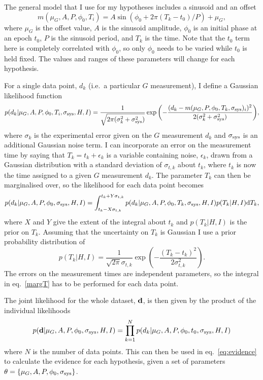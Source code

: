 \documentclass[page-classic]{epl2}
\begin{document}
The general model that I use for my hypotheses includes a sinusoid and an offset
\begin{equation}\label{eq:model}
 m(\mu_G, A, P, \phi_0, T_i) = A\sin{(\phi_0 + 2\pi (T_k-t_0)/P)} + \mu_G,
\end{equation}
where $\mu_G$ is the offset value, $A$ is the sinusoid amplitude, $\phi_0$ is an initial phase at an epoch $t_0$,
$P$ is the sinusoid period, and $T_k$ is the time. Note that the $t_0$ term here is completely correlated
with $\phi_0$, so only $\phi_0$ needs to be varied while $t_0$ is held fixed. The values and ranges of these 
parameters will change for each hypothesis.

For a single data point, $d_k$ (i.e.\ a particular $G$ measurement), I define a Gaussian likelihood function
\begin{equation}
 p(d_k|\mu_G,A,P,\phi_0,T_i,\sigma_{\rm sys},H,I) = \frac{1}{\sqrt{2\pi(\sigma_k^2 + \sigma_{\rm sys}^2)}} \exp{\left(-\frac{(d_k - m(\mu_G,P,\phi_0,T_k,\sigma_{\rm sys})_i)^2}{2(\sigma_k^2 + \sigma_{\rm sys}^2)} \right)},
\end{equation}
where $\sigma_k$ is the experimental error given on the $G$ measurement $d_k$ and $\sigma_{\rm sys}$ is an
additional Gaussian noise term. I can incorporate an error on the measurement time by saying that
$T_k = t_k + \epsilon_k$ is a variable containing noise, $\epsilon_k$, drawn from a Gaussian distribution
with a standard deviation of $\sigma_{t,k}$ about $t_k$, where $t_k$ is now the time assigned to a given $G$ 
measurement $d_k$. The parameter $T_k$ can then be marginalised over, so the likelihood for each data point becomes
\begin{equation}\label{eq:margT}
 p(d_k|\mu_G, A, P, \phi_0, \sigma_{\rm sys},H,I) = \int_{t_k-X\sigma_{t,k}}^{t_k+Y\sigma_{t,k}}  p(d_k|\mu_G, A, P, \phi_0, T_k, \sigma_{\rm sys},H,I) p(T_k|H,I) {\rm d}T_k,
\end{equation}
where $X$ and $Y$ give the extent of the integral about $t_k$ and $p(T_k|H,I)$ is the prior on $T_k$.
Assuming that the uncertainty on $T_k$ is Gaussian I use a prior probability distribution of
\begin{equation}
 p(T_k|H,I) = \frac{1}{\sqrt{2\pi}\sigma_{t,k}}\exp{\left(-\frac{(T_k-t_k)^2}{2\sigma_{t,k}^2} \right)}.
\end{equation}
The errors on the measurement times are independent parameters, so the integral in eq.~\ref{margT} has to be
performed for each data point.

The joint likelihood for the whole dataset, $\mathbf{d}$, is then given by the product of the individual likelihoods
\begin{equation}\label{eq:jointlike}
 p(\mathbf{d}|\mu_G, A, P, \phi_0, \sigma_{\rm sys},H,I) = \prod_{k=1}^N p(d_k|\mu_G, A, P, \phi_0, t_0,\sigma_{\rm sys},H,I)
\end{equation}
where $N$ is the number of data points. This can then be used in eq.~\ref{eq:evidence} to calculate the evidence
for each hypothesis, given a set of parameters $\mathbf{\theta} = \{\mu_G, A, P, \phi_0, \sigma_{\rm sys}\}$.
\end{document}
